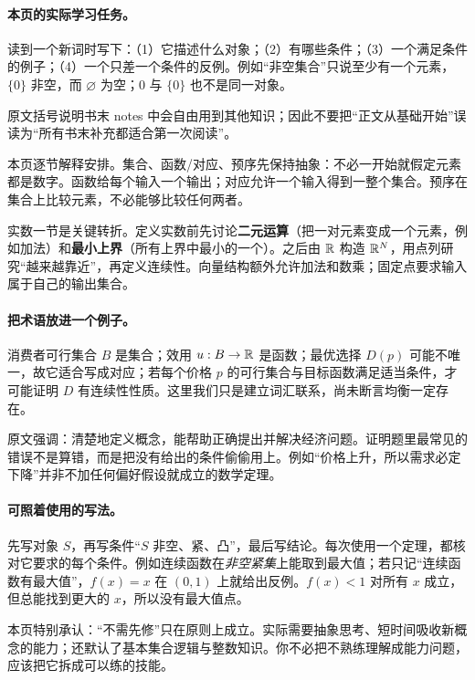 \paragraph{本页的实际学习任务。}读到一个新词时写下：（1）它描述什么对象；（2）有哪些条件；（3）一个满足条件的例子；（4）一个只差一个条件的反例。例如“非空集合”只说至少有一个元素，$\{0\}$ 非空，而 $\varnothing$ 为空；$0$ 与 $\{0\}$ 也不是同一对象。

原文括号说明书末 notes 中会自由用到其他知识；因此不要把“正文从基础开始”误读为“所有书末补充都适合第一次阅读”。

本页逐节解释安排。集合、函数/对应、预序先保持抽象：不必一开始就假定元素都是数字。函数给每个输入一个输出；对应允许一个输入得到一整个集合。预序在集合上比较元素，不必能够比较任何两者。

实数一节是关键转折。定义实数前先讨论\textbf{二元运算}（把一对元素变成一个元素，例如加法）和\textbf{最小上界}（所有上界中最小的一个）。之后由 $\mathbb{R}$ 构造 $\mathbb{R}^N$，用点列研究“越来越靠近”，再定义连续性。向量结构额外允许加法和数乘；固定点要求输入属于自己的输出集合。

\paragraph{把术语放进一个例子。}消费者可行集合 $B$ 是集合；效用 $u:B\to\mathbb{R}$ 是函数；最优选择 $D(p)$ 可能不唯一，故它适合写成对应；若每个价格 $p$ 的可行集合与目标函数满足适当条件，才可能证明 $D$ 有连续性性质。这里我们只是建立词汇联系，尚未断言均衡一定存在。

原文强调：清楚地定义概念，能帮助正确提出并解决经济问题。证明题里最常见的错误不是算错，而是把没有给出的条件偷偷用上。例如“价格上升，所以需求必定下降”并非不加任何偏好假设就成立的数学定理。

\paragraph{可照着使用的写法。}先写对象 $S$，再写条件“$S$ 非空、紧、凸”，最后写结论。每次使用一个定理，都核对它要求的每个条件。例如连续函数在\emph{非空紧集}上能取到最大值；若只记“连续函数有最大值”，$f(x)=x$ 在 $(0,1)$ 上就给出反例。$f(x)<1$ 对所有 $x$ 成立，但总能找到更大的 $x$，所以没有最大值点。

本页特别承认：“不需先修”只在原则上成立。实际需要抽象思考、短时间吸收新概念的能力；还默认了基本集合逻辑与整数知识。你不必把不熟练理解成能力问题，应该把它拆成可以练的技能。

